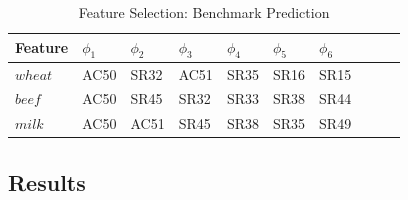 \begin{table}[H]
\centering
\begin{tabular}{ |p{2cm}|p{1cm}|p{1cm}|p{1cm}|p{1cm}|p{1cm}|p{1cm}|p{1cm}|p{1cm}|p{1cm}| }
  \hline
 Feature &  $\phi_1$ &  $\phi_2$ &  $\phi_3$ &  $\phi_4$ &  $\phi_5$&  $\phi_6$    \\
 \hline

 $wheat$ & AC50   & SR32   & AC51 &  SR35  & SR16 & SR15 \\
  \hline
  $beef$ & AC50 & SR45 & SR32 & SR33 & SR38 & SR44  \\
  \hline
  $milk$ & AC50 & AC51 & SR45 & SR38 & SR35 & SR49  \\

  \hline
 \end{tabular}
\caption{Feature Selection: Benchmark Prediction}
\label{tab:feat_mod2}
\end{table}


\subsection{Results}

